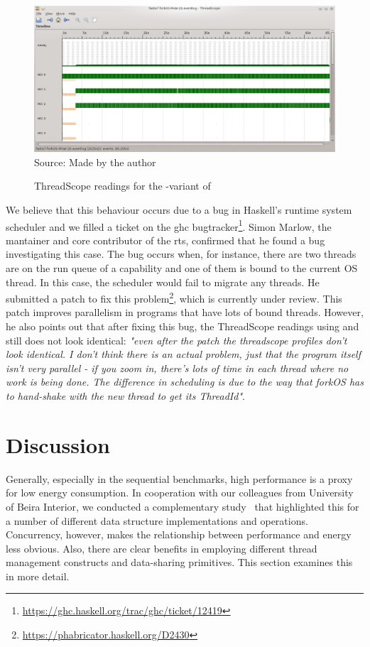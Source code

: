 \begin{figure}
\caption{ThreadScope readings for the \forkOS-\MVar variant of \fasta}
\centering
\includegraphics[width=\linewidth]{images/fasta-forkOS-MVar-20}
\footnotesize{Source: Made by the author}
\label{fig:threadscope2}
\end{figure}

We believe that this behaviour occurs due to a bug in Haskell's runtime system scheduler and we filled a ticket on the \ac{ghc} bugtracker\footnote{\url{https://ghc.haskell.org/trac/ghc/ticket/12419}}. Simon Marlow, the mantainer and core contributor of the \acl{rts}, confirmed that he found a bug investigating this case. The bug occurs when, for instance, there are two threads are on the run queue of a capability and one of them is bound to the current OS thread. In this case, the scheduler would fail to migrate any threads. He submitted a patch to fix this problem\footnote{\url{https://phabricator.haskell.org/D2430}}, which is currently under review. This patch improves parallelism in programs that have lots of bound threads. However, he also points out that after fixing this bug, the ThreadScope readings using \forkIO and \forkOS still does not look identical: \emph{"even after the patch the threadscope profiles don't look identical. I don't think there is an actual problem, just that the program itself isn't very parallel - if you zoom in, there's lots of time in each thread where no work is being done. The difference in scheduling is due to the way that forkOS has to hand-shake with the new thread to get its ThreadId"}.


\section{Discussion}\label{sec:discussion}
Generally, especially in the sequential benchmarks, high performance is a proxy for low energy consumption. In cooperation with our colleagues from University of Beira Interior, we conducted a complementary study~\cite{lima:2016} that highlighted this for a number of different data structure implementations and operations. Concurrency, however, makes the relationship between performance and energy less obvious. Also, there are clear benefits in employing  different thread management constructs and data-sharing primitives. This section examines this in more detail.

